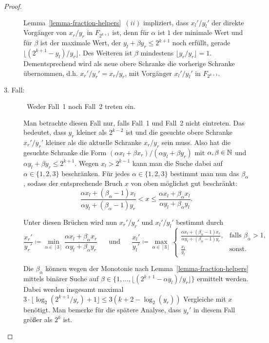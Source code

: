 \begin{proof}
\begin{description}
		Lemma~\ref{lemma-fraction-helpers}~$(ii)$ impliziert, dass $x_l'/y_l'$ der direkte Vorgänger von $x_r/y_r$ in $F_{2^{k+1}}$ ist, denn für $\alpha$ ist $1$ der minimale Wert und für $\beta$ ist der maximale Wert, der $y_l + \beta y_r \leq 2^{k+1}$ noch erfüllt, gerade $\lfloor (2^{k+1} - y_l)/y_r \rfloor$.
		Des Weiteren ist $\beta$ mindestens $\lfloor y_r/y_r \rfloor = 1$.
		Dementsprechend wird als neue obere Schranke die vorherige Schranke übernommen, d.h. $x_r'/y_r' = x_r/y_r$, mit Vorgänger $x_l'/y_l'$ in $F_{2^{k+1}}$.
		
		\item[3. Fall:]~Weder Fall~1 noch Fall~2 treten ein.
		
			Man betrachte diesen Fall nur, falls Fall~1 und Fall~2 nicht eintreten.
			Das bedeutet, dass $y_r$ kleiner als $2^{k-2}$ ist und die gesuchte obere Schranke $x_r'/y_r'$ kleiner als die aktuelle Schranke $x_r/y_r$ sein muss.
			Also hat die gesuchte Schranke die Form $(\alpha x_l + \beta x_r)/(\alpha y_l + \beta y_r)$ mit $\alpha,\beta\in\mathbb{N}$ und $\alpha y_l + \beta y_r\leq 2^{k+1}$.
			Wegen $x_l > 2^{k-1}$ kann man die Suche dabei auf $\alpha \in \{ 1, 2, 3 \}$ beschränken.
			Für jedes $\alpha\in\{1,2,3\}$ bestimmt man nun das $\beta_\alpha$, sodass der entsprechende Bruch $x$ von oben möglichst gut beschränkt:
			\[
				\frac{\alpha x_l + (\beta_\alpha - 1) x_l}{\alpha y_l + (\beta_\alpha - 1) y_r} < x \leq \frac{\alpha x_l + \beta_\alpha x_l}{\alpha y_l + \beta_\alpha y_l}.
			\]
			
			Unter diesen Brüchen wird nun $x_r'/y_r'$ und $x_l'/y_l'$ bestimmt durch
			\[\frac{x_r'}{y_r'}\coloneq \min_{\alpha\in[3]} \frac{\alpha x_l + \beta_\alpha x_r}{\alpha y_l + \beta_\alpha y_r}
			\text{~~~~~und~~~~~}
			\frac{x_l'}{y_l'}\coloneq \max_{\alpha\in[3]} \begin{cases}
			\frac{\alpha x_l + (\beta_\alpha - 1)x_r}{\alpha y_l + (\beta_\alpha - 1)y_r}, &\text{falls $\beta_\alpha > 1$,}\\
			\frac{x_l}{y_l} &\text{sonst.}
			\end{cases}
		\]
			
			Die $\beta_\alpha$ können wegen der Monotonie nach Lemma~\ref{lemma-fraction-helpers} mittels binärer Suche auf $\beta \in \{1,\dots, \lfloor (2^{k+1} - \alpha y_l) / y_r \rfloor \}$ ermittelt werden.
			Dabei werden insgesamt maximal $3 \cdot \lfloor \log_2(2^{k+1} / y_r) + 1 \rfloor \leq 3 (k+2 - \log_2(y_r))$ Vergleiche mit $x$ benötigt.
			Man bemerke für die spätere Analyse, dass $y_r'$ in diesem Fall größer als $2^k$ ist.
 	\end{description}
 	

\end{proof}
